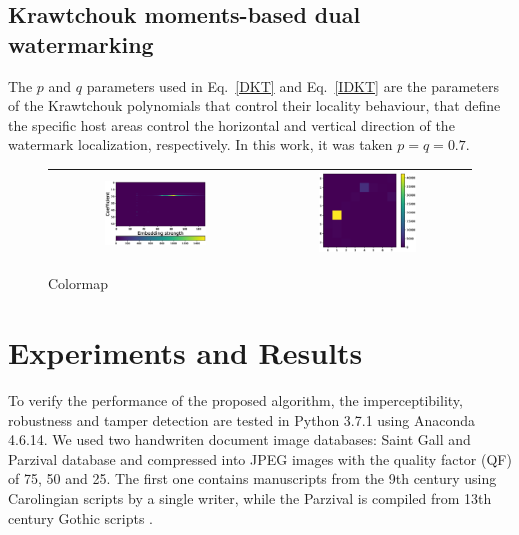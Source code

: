 \documentclass[runningheads]{llncs}
\begin{document}
\subsection{Krawtchouk moments-based dual watermarking}
The $p$ and $q$ parameters used in Eq.~\ref{DKT} and Eq.~\ref{IDKT} are the parameters of the Krawtchouk polynomials that control their locality behaviour, that define the specific host areas control the horizontal and vertical direction of the watermark localization, respectively. In this work, it was taken $p=q=0.7$.
\begin{figure}[H]
	\begin{center}
		\begin{tabular}{|c|c|}\hline
			\includegraphics[width=0.5\textwidth]{colormapDKT.eps}
			&\includegraphics[width=0.5\textwidth]{coefDKT.eps}\\\hline
		\end{tabular}
	\end{center}
	\caption{Colormap}
	\label{colormapDKT}
\end{figure}

\section{Experiments and Results}
To verify the performance of the proposed algorithm, the imperceptibility, robustness and tamper detection are tested in Python 3.7.1 using Anaconda 4.6.14. We used two handwriten document image databases: Saint Gall \cite{fischer2011transcription} and Parzival \cite{fischer2009automatic} database and compressed into JPEG images with the
quality factor (QF) of 75, 50 and 25. The first one contains manuscripts from the 9th century using Carolingian scripts by a single writer, while the Parzival is compiled from 13th century Gothic scripts \cite{pastor2016complete}.
\end{document}
